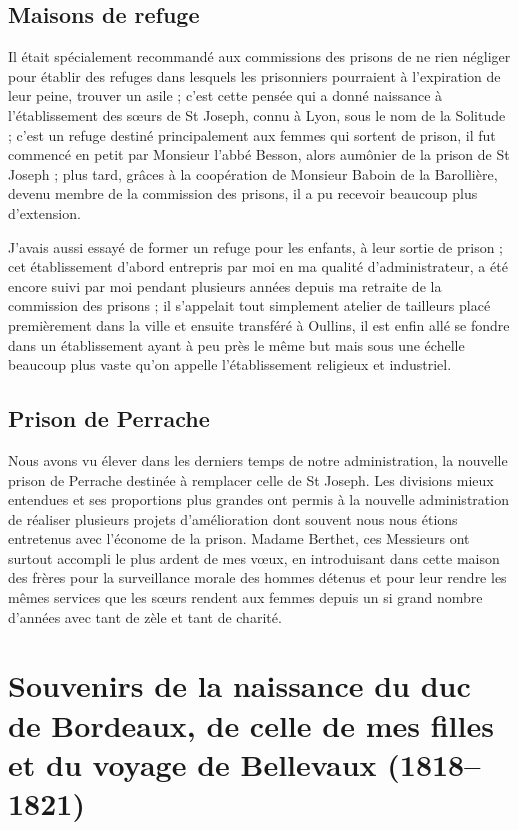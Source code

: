 \documentclass[11pt,a4paper]{report}
\begin{document}
\section*{Maisons de refuge}

Il était spécialement recommandé aux commissions des prisons de ne rien négliger pour établir des refuges dans lesquels les prisonniers pourraient à l'expiration de leur peine, trouver un asile ; c'est cette pensée qui a donné naissance à l'établissement des sœurs de St Joseph, connu à Lyon, sous le nom de la Solitude ; c'est un refuge destiné principalement aux femmes qui sortent de prison, il fut commencé en petit par Monsieur l'abbé Besson, alors aumônier de la prison de St Joseph ; plus tard, grâces à la coopération de Monsieur Baboin de la Barollière, devenu membre de la commission des prisons, il a pu recevoir beaucoup plus d'extension.

J'avais aussi essayé de former un refuge pour les enfants, à leur sortie de prison ; cet établissement d'abord entrepris par moi en ma qualité d'administrateur, a été encore suivi par moi pendant plusieurs années depuis ma retraite de la commission des prisons ; il s'appelait tout simplement atelier de tailleurs placé premièrement dans la ville et ensuite transféré à Oullins, il est enfin allé se fondre dans un établissement ayant à peu près le même but mais sous une échelle beaucoup plus vaste qu'on appelle l'établissement religieux et industriel.

\section*{Prison de Perrache}

Nous avons vu élever dans les derniers temps de notre administration, la nouvelle prison de Perrache destinée à remplacer celle de St Joseph. Les divisions mieux entendues et ses proportions plus grandes ont permis à la nouvelle administration de réaliser plusieurs projets d'amélioration dont souvent nous nous étions entretenus avec l'économe de la prison. Madame Berthet, ces Messieurs ont surtout accompli le plus ardent de mes vœux, en introduisant dans cette maison des frères pour la surveillance morale des hommes détenus et pour leur rendre les mêmes services que les sœurs rendent aux femmes depuis un si grand nombre d'années avec tant de zèle et tant de charité.


\chapter{Souvenirs de la naissance du duc de Bordeaux, de celle de mes filles et du voyage de Bellevaux (1818--1821)}
\end{document}
